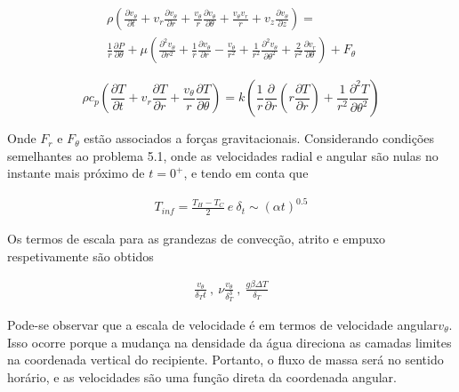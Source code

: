 \documentclass[12pt]{article}
\begin{document}
\begin{align}
	\rho \left( \frac{\partial v_\theta}{\partial t} + v_r \frac{\partial v_\theta}{\partial r} + \frac{v_\theta}{r} \frac{\partial v_\theta}{\partial \theta} + \frac{v_\theta v_{r}}{r} + v_z \frac{\partial v_\theta}{\partial z} \right) = \\
	\frac{1}{r}\frac{\partial P}{\partial \theta} + \mu \left( \frac{\partial^2 v_\theta}{\partial r^2} + \frac{1}{r} \frac{\partial v_\theta}{\partial r} - \frac{v_\theta}{r^2} + \frac{1}{r^{2}}\frac{\partial^2 v_\theta}{\partial \theta^2} + \frac{2}{r^{2}}  \frac{\partial v_r}{\partial \theta}      \right) + F_{\theta}
\end{align}

\begin{equation}
	\rho c_p \left( \frac{\partial T}{\partial t} + v_r \frac{\partial T}{\partial r} + \frac{v_\theta}{r} \frac{\partial T}{\partial \theta} \right) = k \left( \frac{1}{r} \frac{\partial}{\partial r} \left( r \frac{\partial T}{\partial r} \right) +\frac{1}{r^{2}} \frac{\partial^2 T}{\partial \theta^2} \right)
\end{equation}


Onde $F_{r} $ e $F_{\theta} $ estão associados a forças gravitacionais. Considerando condições semelhantes ao problema 5.1, onde as velocidades radial e angular são nulas no instante mais próximo de $t=0^{+}$, e tendo em conta que

\begin{align}
	T_{inf} = \frac{T_{H} - T_{C}}{2} \ e \ \delta_{t}\sim(\alpha t)^{0.5}
\end{align}

Os termos de escala para as grandezas de convecção, atrito e empuxo respetivamente são obtidos

\begin{align}
	\frac{v_{\theta}}{\delta_{T}t} \ , \ \nu \frac{v_{\theta}}{\delta_{T}^{3}} \ , \ \frac{g\beta \Delta T}{\delta_{T}}
\end{align}

Pode-se observar que a escala de velocidade é em termos de velocidade angular$v_{\theta}$. Isso ocorre porque a mudança na densidade da água direciona as camadas limites na coordenada vertical do recipiente. Portanto, o fluxo de massa será no sentido horário, e as velocidades são uma função direta da coordenada angular.\\
\end{document}
